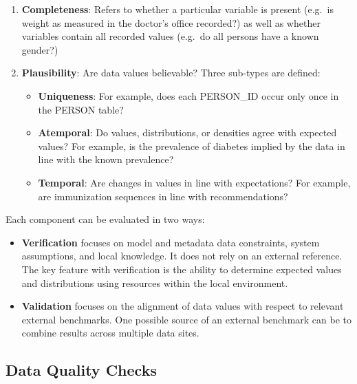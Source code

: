 \documentclass[11pt]{book}
\providecommand{\tightlist}{%
  \setlength{\itemsep}{0pt}\setlength{\parskip}{0pt}}
\theoremstyle{definition}
\theoremstyle{definition}
\theoremstyle{definition}
\theoremstyle{remark}
\begin{document}
\begin{enumerate}
\def\labelenumi{\arabic{enumi}.}
\setcounter{enumi}{1}
\tightlist
\item
  \textbf{Completeness}: Refers to whether a particular variable is
  present (e.g.~is weight as measured in the doctor's office recorded?)
  as well as whether variables contain all recorded values (e.g.~do all
  persons have a known gender?)
\item
  \textbf{Plausibility}: Are data values believable? Three sub-types are
  defined:

  \begin{itemize}
  \tightlist
  \item
    \textbf{Uniqueness}: For example, does each PERSON\_ID occur only
    once in the PERSON table?
  \item
    \textbf{Atemporal}: Do values, distributions, or densities agree
    with expected values? For example, is the prevalence of diabetes
    implied by the data in line with the known prevalence?
  \item
    \textbf{Temporal}: Are changes in values in line with expectations?
    For example, are immunization sequences in line with
    recommendations?
  \end{itemize}

   
\end{enumerate}

Each component can be evaluated in two ways:

\begin{itemize}
\tightlist
\item
  \textbf{Verification} focuses on model and metadata data constraints,
  system assumptions, and local knowledge. It does not rely on an
  external reference. The key feature with verification is the ability
  to determine expected values and distributions using resources within
  the local environment.
\item
  \textbf{Validation} focuses on the alignment of data values with
  respect to relevant external benchmarks. One possible source of an
  external benchmark can be to combine results across multiple data
  sites.
\end{itemize}

 

\subsection{Data Quality Checks}\label{data-quality-checks}
\end{document}
